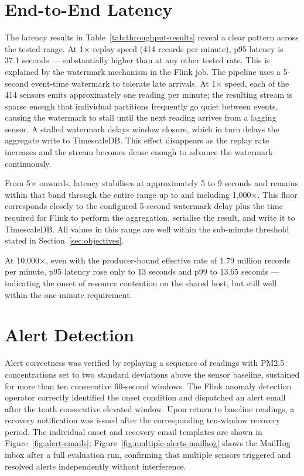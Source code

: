 \section{End-to-End Latency}

The latency results in Table~\ref{tab:throughput-results} reveal a clear pattern across the tested range. At 1× replay speed (414 records per minute), p95 latency is 37.1 seconds — substantially higher than at any other tested rate. This is explained by the watermark mechanism in the Flink job. The pipeline uses a 5-second event-time watermark to tolerate late arrivals. At 1× speed, each of the 414 sensors emits approximately one reading per minute; the resulting stream is sparse enough that individual partitions frequently go quiet between events, causing the watermark to stall until the next reading arrives from a lagging sensor. A stalled watermark delays window closure, which in turn delays the aggregate write to TimescaleDB. This effect disappears as the replay rate increases and the stream becomes dense enough to advance the watermark continuously.

From 5× onwards, latency stabilises at approximately 5 to 9 seconds and remains within that band through the entire range up to and including 1,000×. This floor corresponds closely to the configured 5-second watermark delay plus the time required for Flink to perform the aggregation, serialise the result, and write it to TimescaleDB. All values in this range are well within the sub-minute threshold stated in Section~\ref{sec:objectives}.

At 10,000×, even with the producer-bound effective rate of 1.79 million records per minute, p95 latency rose only to 13 seconds and p99 to 13.65 seconds — indicating the onset of resource contention on the shared host, but still well within the one-minute requirement.

\section{Alert Detection}

Alert correctness was verified by replaying a sequence of readings with PM2.5 concentrations set to two standard deviations above the sensor baseline, sustained for more than ten consecutive 60-second windows. The Flink anomaly detection operator correctly identified the onset condition and dispatched an alert email after the tenth consecutive elevated window. Upon return to baseline readings, a recovery notification was issued after the corresponding ten-window recovery period. The individual onset and recovery email templates are shown in Figure~\ref{fig:alert-emails}; Figure~\ref{fig:multiple-alerts-mailhog} shows the MailHog inbox after a full evaluation run, confirming that multiple sensors triggered and resolved alerts independently without interference.

